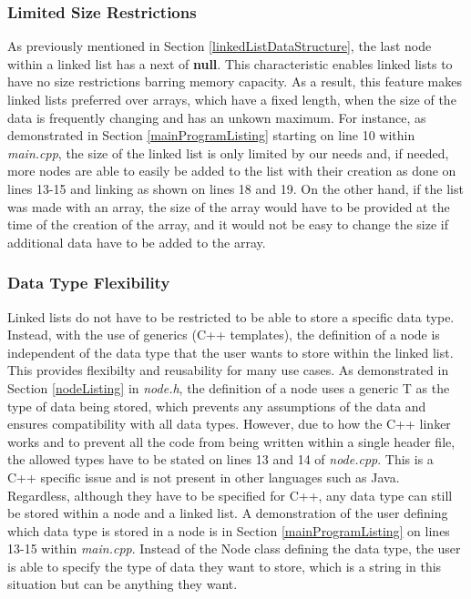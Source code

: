 \documentclass[letterpaper, 10pt,DIV=13]{scrartcl}
\numberwithin{equation}{section} %
\numberwithin{figure}{section} %
\numberwithin{table}{section} %
\begin{document}
\subsubsection{Limited Size Restrictions}
As previously mentioned in Section \ref{linkedListDataStructure}, the last node within a linked list has a next of \textbf{null}. This characteristic enables linked lists to have no size restrictions barring memory capacity.
As a result, this feature makes linked lists preferred over arrays, which have a fixed length, when the size of the data is frequently changing and has an unkown maximum. For instance, as demonstrated in
Section \ref{mainProgramListing} starting on line 10 within \textit{main.cpp}, the size of the linked list is only limited by our needs and, if needed, more nodes are able
to easily be added to the list with their creation as done on lines 13-15 and linking as shown on lines 18 and 19. On the other hand, if the list was made with an array,
the size of the array would have to be provided at the time of the creation of the array, and it would not be easy to change the size if additional data have to be added
to the array.

\subsubsection{Data Type Flexibility}\label{linkedListDataType}
Linked lists do not have to be restricted to be able to store a specific data type. Instead, with the use of generics (C++ templates), the definition of a node is
independent of the data type that the user wants to store within the linked list. This provides flexibilty and reusability for many use cases. As demonstrated in
Section \ref{nodeListing} in \textit{node.h}, the definition of a node uses a generic T as the type of data being stored, which prevents any assumptions of the data
and ensures compatibility with all data types. However, due to how the C++ linker works and to prevent all the code from being written within a single header file,
the allowed types have to be stated on lines 13 and 14 of \textit{node.cpp}. This is a C++ specific issue and is not present in other languages such as Java.
Regardless, although they have to be specified for C++, any data type can still be stored within a node and a linked list. A demonstration of the user defining
which data type is stored in a node is in Section \ref{mainProgramListing} on lines 13-15 within \textit{main.cpp}. Instead of the Node class defining the data type,
the user is able to specify the type of data they want to store, which is a string in this situation but can be anything they want.
\end{document}
